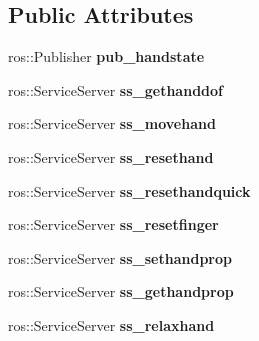 \subsection*{Public Attributes}
\begin{DoxyCompactItemize}
\item 
\hypertarget{classBHD__280_a1ceea3c30d51a438da61158944bf46b8}{ros\-::\-Publisher {\bfseries pub\-\_\-handstate}}\label{classBHD__280_a1ceea3c30d51a438da61158944bf46b8}

\item 
\hypertarget{classBHD__280_a85b0a028cf749c569b1891f30ae0901d}{ros\-::\-Service\-Server {\bfseries ss\-\_\-gethanddof}}\label{classBHD__280_a85b0a028cf749c569b1891f30ae0901d}

\item 
\hypertarget{classBHD__280_a0d0c281e0bf00e9cbd29dcbb6b11c0fe}{ros\-::\-Service\-Server {\bfseries ss\-\_\-movehand}}\label{classBHD__280_a0d0c281e0bf00e9cbd29dcbb6b11c0fe}

\item 
\hypertarget{classBHD__280_aef155c157297be51c392f4e635a003a2}{ros\-::\-Service\-Server {\bfseries ss\-\_\-resethand}}\label{classBHD__280_aef155c157297be51c392f4e635a003a2}

\item 
\hypertarget{classBHD__280_af30b96d9b73f7b28c827853c868adddc}{ros\-::\-Service\-Server {\bfseries ss\-\_\-resethandquick}}\label{classBHD__280_af30b96d9b73f7b28c827853c868adddc}

\item 
\hypertarget{classBHD__280_a1d2cba5b6c1888623dd2dd227dce6ff6}{ros\-::\-Service\-Server {\bfseries ss\-\_\-resetfinger}}\label{classBHD__280_a1d2cba5b6c1888623dd2dd227dce6ff6}

\item 
\hypertarget{classBHD__280_aee152ea2ff3d54b99f4a63955e89c5b9}{ros\-::\-Service\-Server {\bfseries ss\-\_\-sethandprop}}\label{classBHD__280_aee152ea2ff3d54b99f4a63955e89c5b9}

\item 
\hypertarget{classBHD__280_ab05c8750a2cd9fe48d6a0fd4a11940ed}{ros\-::\-Service\-Server {\bfseries ss\-\_\-gethandprop}}\label{classBHD__280_ab05c8750a2cd9fe48d6a0fd4a11940ed}

\item 
\hypertarget{classBHD__280_a8df1f7594829748cb56c6d97c31e43cc}{ros\-::\-Service\-Server {\bfseries ss\-\_\-relaxhand}}\label{classBHD__280_a8df1f7594829748cb56c6d97c31e43cc}


\end{DoxyCompactItemize}

